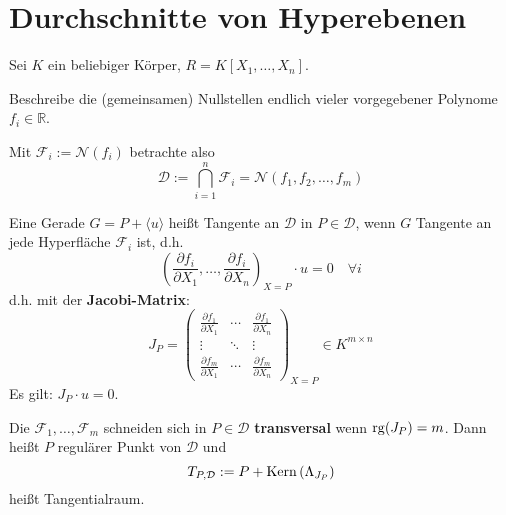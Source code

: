\documentclass[parskip,a4paper,twoside,DIV15,BCOR12mm]{scrbook}
\begin{document}
\section{Durchschnitte von Hyperebenen}
Sei \(K\) ein beliebiger Körper, \(R=K[X_{1},\ldots,X_{n}]\).
\begin{problem}
Beschreibe die (gemeinsamen) Nullstellen endlich vieler vorgegebener Polynome
\(f_{i}\in\mathbb{R}\).

Mit \(\mathcal{F}_{i}:=\mathcal{N}(f_{i})\) betrachte also
\[
\mathcal{D}:=\bigcap_{i=1}^{n}{\mathcal{F}_{i}}
    =\mathcal{N}(f_{1},f_{2},\ldots,f_{m})
\]
\end{problem}
Eine Gerade \(G=P+\langle u\rangle\) heißt Tangente an \(\mathcal{D}\) in
\(P\in\mathcal{D}\), wenn \(G\) Tangente an jede Hyperfläche 
\(\mathcal{F}_{i}\) ist, d.h.
\[
\left(\frac{\partial f_{i}}{\partial X_{1}},\ldots,\frac{\partial f_{i}}{\partial X_{n}}\right)_{X=P}\cdot u=0\quad\forall i
\]
d.h. mit der \textbf{Jacobi-Matrix}:
\[
J_{P}=\begin{pmatrix}
\frac{\partial f_{1}}{\partial X_{1}}&\cdots&\frac{\partial f_{1}}{\partial X_{n}}\\
\vdots&\ddots&\vdots\\
\frac{\partial f_{m}}{\partial X_{1}}&\cdots&\frac{\partial f_{m}}{\partial X_{n}}
\end{pmatrix}_{X=P}\in K^{m\times n}
\]
Es gilt: \(J_{P}\cdot u=0\).
\begin{definition}
Die \(\mathcal{F}_{1},\ldots,\mathcal{F}_{m}\) schneiden sich in 
\(P\in\mathcal{D}\) \textbf{transversal} wenn \(\operatorname{rg}(J_{P})=m\). Dann heißt
\(P\) regulärer Punkt von \(\mathcal{D}\) und 
\[
T_{P,\mathcal{D}}:=P+\operatorname{Kern}\left(\Lambda_{J_{P}}\right)
\]
heißt Tangentialraum.
\end{definition}
\begin{comment}
\(T_{P,\mathcal{D}}=T_{P,\mathcal{F}_{1}}\cap\ldots\cap T_{P,\mathcal{F}_{n}}\)
bei transversalem Schneiden.
\end{comment}
\end{document}
